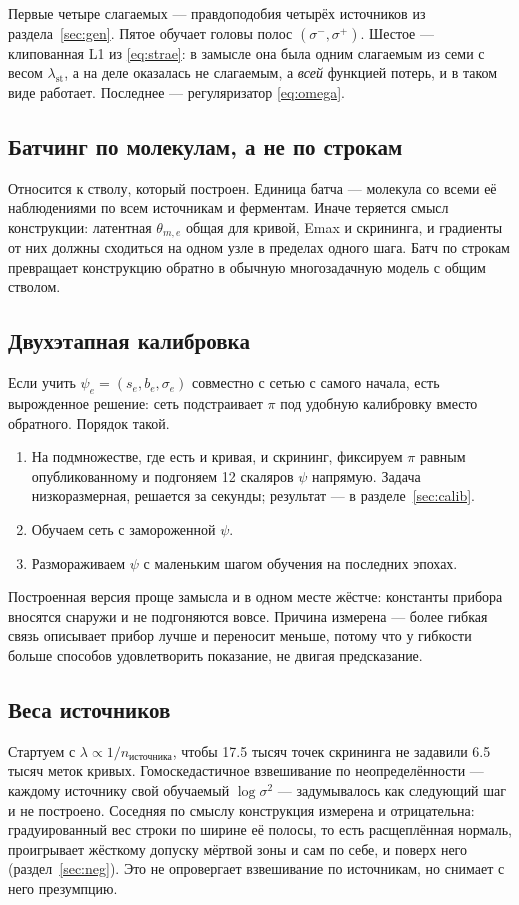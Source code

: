 Первые четыре слагаемых --- правдоподобия четырёх источников из раздела~\ref{sec:gen}. Пятое обучает
головы полос $(\sigma^-,\sigma^+)$. Шестое --- клипованная L1 из \eqref{eq:strae}: в замысле она
была одним слагаемым из семи с весом $\lambda_{\text{st}}$, а на деле оказалась не слагаемым, а
\emph{всей} функцией потерь, и в таком виде работает. Последнее --- регуляризатор \eqref{eq:omega}.

\subsection{Батчинг по молекулам, а не по строкам}

Относится к стволу, который построен. Единица батча --- молекула со всеми её наблюдениями по всем
источникам и ферментам. Иначе теряется смысл конструкции: латентная $\theta_{m,e}$ общая для кривой,
Emax и скрининга, и градиенты от них должны сходиться на одном узле в пределах одного шага. Батч по
строкам превращает конструкцию обратно в обычную многозадачную модель с общим стволом.

\subsection{Двухэтапная калибровка}

Если учить $\psi_e = (s_e, b_e, \sigma_e)$ совместно с сетью с самого начала, есть вырожденное
решение: сеть подстраивает $\pi$ под удобную калибровку вместо обратного. Порядок такой.

\begin{enumerate}
\item На подмножестве, где есть и кривая, и скрининг, фиксируем $\pi$ равным опубликованному и подгоняем
12 скаляров $\psi$ напрямую. Задача низкоразмерная, решается за секунды; результат --- в
разделе~\ref{sec:calib}.
\item Обучаем сеть с замороженной $\psi$.
\item Размораживаем $\psi$ с маленьким шагом обучения на последних эпохах.
\end{enumerate}

Построенная версия проще замысла и в одном месте жёстче: константы прибора вносятся снаружи и не
подгоняются вовсе. Причина измерена --- более гибкая связь описывает прибор лучше и переносит
меньше, потому что у гибкости больше способов удовлетворить показание, не двигая предсказание.

\subsection{Веса источников}

Стартуем с $\lambda \propto 1/n_{\text{источника}}$, чтобы 17.5 тысяч точек скрининга не задавили
6.5 тысяч меток кривых. Гомоскедастичное взвешивание по неопределённости --- каждому источнику свой
обучаемый $\log \sigma^2$ --- задумывалось как следующий шаг и не построено. Соседняя по смыслу
конструкция измерена и отрицательна: градуированный вес строки по ширине её полосы, то есть
расщеплённая нормаль, проигрывает жёсткому допуску мёртвой зоны и сам по себе, и поверх него
(раздел~\ref{sec:neg}). Это не опровергает взвешивание по источникам, но снимает с него презумпцию.
